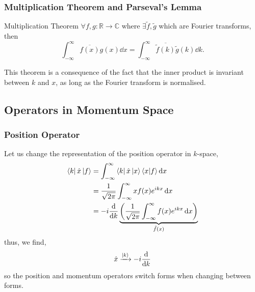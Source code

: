 \documentclass{book}
\renewcommand{\braket}[2]{\langle#1|#2\rangle}
\begin{document}
\subsubsection{Multiplication Theorem and Parseval's Lemma}
\begin{Theorems}{Multiplication Theorem}{}
	$\forall f, g : \mathbb{R} \to \mathbb{C}$ where $\exists \tilde{f},\tilde{g}$ which are Fourier transforms, then
	\begin{equation}
		\int_{-\infty}^{\infty}\overline{f(x)}g(x)\dd{x} = \int_{-\infty}^{\infty}\overline{\tilde{f}(k)}\tilde{g}(k)\dd{k}.
	\end{equation}
\end{Theorems}
This theorem is a consequence of the fact that the inner product is invariant between $k$ and $x$, as long as the Fourier transform is normalised.
\subsection{Operators in Momentum Space}
\subsubsection{Position Operator}
Let us change the representation of the position operator in $k$-space,
\begin{equation}
	\begin{split}
	\bra{k}\hat{x}\ket{f} & = \int_{-\infty}^{\infty}\bra{k}\hat{x}\ket{x}\braket{x}{f}\dd{x} \\
	& = \frac{1}{\sqrt{2\pi}}\int_{-\infty}^{\infty}xf(x)e^{ikx}\dd{x} \\
	& = -i\dv{k}\underbrace{\left(\frac{1}{\sqrt{2\pi}}\int_{-\infty}^{\infty}f(x)e^{ikx}\dd{x}\right)}_{\tilde{f}(x)}
	\end{split}
\end{equation}
thus, we find,
\begin{equation}
	\hat{x} \xrightarrow{\ket{k}} - i\dv{k}
\end{equation}
so the position and momentum operators switch forms when changing between forms.
\end{document}
